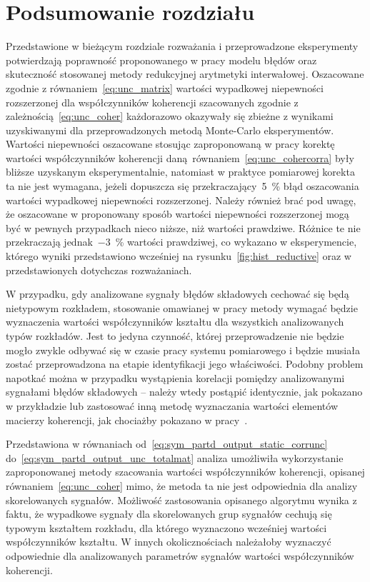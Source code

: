 \section{Podsumowanie rozdziału}

Przedstawione w bieżącym rozdziale rozważania i przeprowadzone eksperymenty potwierdzają poprawność proponowanego w pracy modelu błędów oraz skuteczność stosowanej metody redukcyjnej arytmetyki interwałowej. Oszacowane zgodnie z równaniem~\eqref{eq:unc_matrix} wartości wypadkowej niepewności rozszerzonej dla współczynników koherencji szacowanych zgodnie z zależnością~\eqref{eq:unc_coher} każdorazowo okazywały się zbieżne z wynikami uzyskiwanymi dla przeprowadzonych metodą Monte-Carlo eksperymentów. Wartości niepewności oszacowane stosując zaproponowaną w pracy korektę wartości współczynników koherencji daną równaniem~\eqref{eq:unc_cohercorra} były bliższe uzyskanym eksperymentalnie, natomiast w praktyce pomiarowej korekta ta nie jest wymagana, jeżeli dopuszcza się przekraczający~\qty{5}{\percent} błąd oszacowania wartości wypadkowej niepewności rozszerzonej. Należy również brać pod uwagę, że oszacowane w proponowany sposób wartości niepewności rozszerzonej mogą być w pewnych przypadkach nieco niższe, niż wartości prawdziwe. Różnice te nie przekraczają jednak~\qty{-3}{\percent} wartości prawdziwej, co wykazano w eksperymencie, którego wyniki przedstawiono wcześniej na rysunku~\ref{fig:hist_reductive} oraz w przedstawionych dotychczas rozważaniach.

W przypadku, gdy analizowane sygnały błędów składowych cechować się będą nietypowym rozkładem, stosowanie omawianej w pracy metody wymagać będzie wyznaczenia wartości współczynników kształtu dla wszystkich analizowanych typów rozkładów. Jest to jedyna czynność, której przeprowadzenie nie będzie mogło zwykle odbywać się w czasie pracy systemu pomiarowego i będzie musiała zostać przeprowadzona na etapie identyfikacji jego właściwości. Podobny problem napotkać można w przypadku wystąpienia korelacji pomiędzy analizowanymi sygnałami błędów składowych -- należy wtedy postąpić identycznie, jak pokazano w przykładzie lub zastosować inną metodę wyznaczania wartości elementów macierzy koherencji, jak chociażby pokazano w pracy~\cite{jakubiec_reductive}.

Przedstawiona w równaniach od~\eqref{eq:sym_partd_output_static_corrunc} do~\eqref{eq:sym_partd_output_unc_totalmat} analiza umożliwiła wykorzystanie zaproponowanej metody szacowania wartości współczynników koherencji, opisanej równaniem~\eqref{eq:unc_coher} mimo, że metoda ta nie jest odpowiednia dla analizy skorelowanych sygnałów. Możliwość zastosowania opisanego algorytmu wynika z faktu, że wypadkowe sygnały dla skorelowanych grup sygnałów cechują się typowym kształtem rozkładu, dla którego wyznaczono wcześniej wartości współczynników kształtu. W innych okolicznościach należałoby wyznaczyć odpowiednie dla analizowanych parametrów sygnałów wartości współczynników koherencji.

